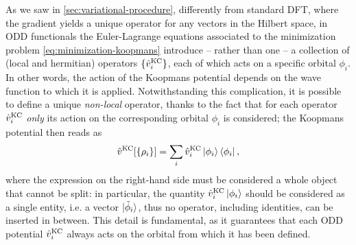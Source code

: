 As we saw in \cref{sec:variational-procedure}, differently from standard DFT, where the gradient yields a unique operator for any vectors in the Hilbert space, in ODD functionals the Euler-Lagrange equations associated to the minimization problem \eqref{eq:minimization-koopmans} introduce -- rather than one -- a collection of (local and hermitian) operators $\{ \hat{v}_i^{\rm KC} \}$, each of which acts on a specific orbital $\phi_i$. In other words, the action of the Koopmans potential depends on the wave function to which it is applied. Notwithstanding this complication, it is possible to define a unique \emph{non-local} operator, thanks to the fact that for each operator $\hat{v}_i^{\rm KC}$ \emph{only} its action on the corresponding orbital $\phi_i$ is considered; the Koopmans potential then reads as
%
\begin{equation}
    \hat{v}^{\rm KC}[\{ \rho_i \}] = \sum_i \hat{v}^{\rm KC}_i \ket{\phi_i} \bra{\phi_i} ,
    \label{eq:koopmans-potential}
\end{equation}
%
where the expression on the right-hand side must be considered a whole object that cannot be split: in particular, the quantity $\hat{v}^{\rm KC}_i \ket{\phi_i}$ should be considered as a single entity, i.e. a vector $\ket{\Tilde{\phi}_i}$, thus no operator, including identities, can be inserted in between. This detail is fundamental, as it guarantees that each ODD potential $\hat{v}^{\rm KC}_i$ always acts on the orbital from which it has been defined.

